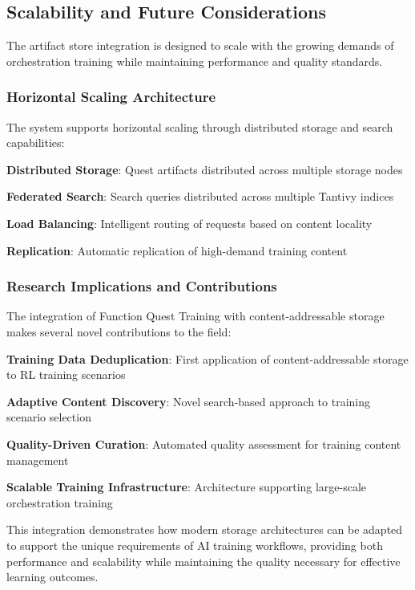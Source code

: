 \subsection*{Scalability and Future Considerations}

The artifact store integration is designed to scale with the growing demands of orchestration training while maintaining performance and quality standards.

\subsubsection*{Horizontal Scaling Architecture}

The system supports horizontal scaling through distributed storage and search capabilities:

\begin{compactlist}
    \item \textbf{Distributed Storage}: Quest artifacts distributed across multiple storage nodes
    \item \textbf{Federated Search}: Search queries distributed across multiple Tantivy indices
    \item \textbf{Load Balancing}: Intelligent routing of requests based on content locality
    \item \textbf{Replication}: Automatic replication of high-demand training content
\end{compactlist}

\subsubsection*{Research Implications and Contributions}

The integration of Function Quest Training with content-addressable storage makes several novel contributions to the field:

\begin{compactlist}
    \item \textbf{Training Data Deduplication}: First application of content-addressable storage to RL training scenarios
    \item \textbf{Adaptive Content Discovery}: Novel search-based approach to training scenario selection
    \item \textbf{Quality-Driven Curation}: Automated quality assessment for training content management
    \item \textbf{Scalable Training Infrastructure}: Architecture supporting large-scale orchestration training
\end{compactlist}

This integration demonstrates how modern storage architectures can be adapted to support the unique requirements of AI training workflows, providing both performance and scalability while maintaining the quality necessary for effective learning outcomes.
